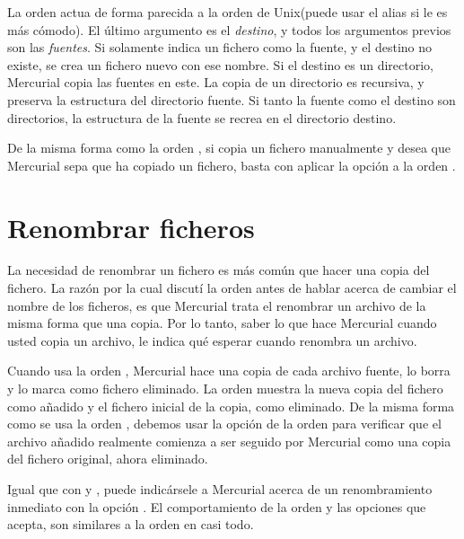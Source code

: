 La orden  actua de forma parecida a la orden 
de Unix(puede usar el alias  si le es más cómodo).  El
último argumento es el \emph{destino}, y todos los argumentos previos
son las \emph{fuentes}.  Si solamente indica un fichero como la
fuente, y el destino no existe, se crea un fichero nuevo con ese nombre.
Si el destino es un directorio, Mercurial copia las fuentes en este.
La copia de un directorio es recursiva, y preserva la estructura del
directorio fuente.
Si tanto la fuente como el destino son directorios, la estructura de
la fuente se recrea en el directorio destino.

De la misma forma como la orden , si copia un fichero
manualmente y desea que Mercurial sepa que ha copiado un fichero,
basta con aplicar la opción  a la orden 
.

\section{Renombrar ficheros}

La necesidad de renombrar un fichero es más común que hacer una copia
del fichero.  La razón por la cual discutí la orden  antes
de hablar acerca de cambiar el nombre de los ficheros, es que
Mercurial trata el renombrar un archivo de la misma forma que una
copia.  Por lo tanto, saber lo que hace Mercurial cuando usted copia
un archivo, le indica qué esperar cuando renombra un archivo.

Cuando usa la orden , Mercurial hace una copia de cada
archivo fuente, lo borra y lo marca como fichero eliminado.
La orden  muestra la nueva copia del fichero como
añadido y el fichero inicial de la copia, como eliminado.
De la misma forma como se usa la orden , debemos usar la
opción  de la orden  para verificar
que el archivo añadido realmente comienza a  ser seguido por Mercurial
como una copia del fichero original, ahora eliminado.

Igual que con  y , puede indicársele a
Mercurial acerca de un renombramiento inmediato con la opción
.   El comportamiento de la orden
 y las opciones que acepta, son similares a la orden
 en casi todo.


